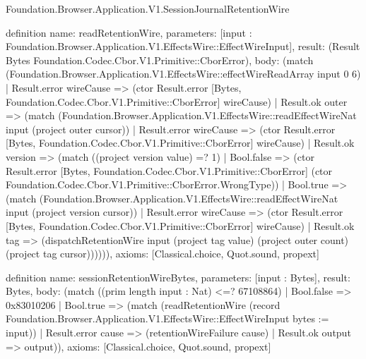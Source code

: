 \begin{lexlean}{Foundation.Browser.Application.V1.SessionJournalRetentionWire}
\begin{semanticmodule}
definition{
  name: readRetentionWire,
  parameters: [input : Foundation.Browser.Application.V1.EffectsWire::EffectWireInput],
  result: (Result Bytes Foundation.Codec.Cbor.V1.Primitive::CborError),
  body: (match (Foundation.Browser.Application.V1.EffectsWire::effectWireReadArray input 0 6)
    | Result.error wireCause => (ctor Result.error [Bytes, Foundation.Codec.Cbor.V1.Primitive::CborError] wireCause)
    | Result.ok outer => (match (Foundation.Browser.Application.V1.EffectsWire::readEffectWireNat input (project outer cursor))
      | Result.error wireCause => (ctor Result.error [Bytes, Foundation.Codec.Cbor.V1.Primitive::CborError] wireCause)
      | Result.ok version => (match ((project version value) =? 1)
        | Bool.false => (ctor Result.error [Bytes, Foundation.Codec.Cbor.V1.Primitive::CborError] (ctor Foundation.Codec.Cbor.V1.Primitive::CborError.WrongType))
        | Bool.true => (match (Foundation.Browser.Application.V1.EffectsWire::readEffectWireNat input (project version cursor))
          | Result.error wireCause => (ctor Result.error [Bytes, Foundation.Codec.Cbor.V1.Primitive::CborError] wireCause)
          | Result.ok tag => (dispatchRetentionWire input (project tag value) (project outer count) (project tag cursor)))))),
  axioms: [Classical.choice, Quot.sound, propext]
}

definition{
  name: sessionRetentionWireBytes,
  parameters: [input : Bytes],
  result: Bytes,
  body: (match ((prim length input : Nat) <=? 67108864)
    | Bool.false => 0x83010206
    | Bool.true => (match (readRetentionWire (record Foundation.Browser.Application.V1.EffectsWire::EffectWireInput {bytes := input}))
      | Result.error cause => (retentionWireFailure cause)
      | Result.ok output => output)),
  axioms: [Classical.choice, Quot.sound, propext]
}
\end{semanticmodule}
\end{lexlean}
